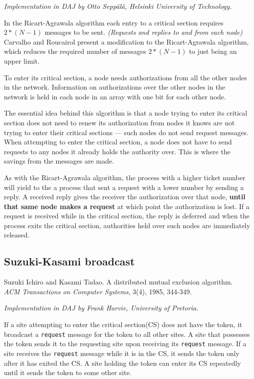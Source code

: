 \documentclass[11pt]{article}
\newcommand{\p}[1]{\texttt{#1}}
\begin{document}
\emph{Implementation in DAJ by Otto Sepp\"al\"a, Helsinki University of Technology.}

In the Ricart-Agrawala algorithm each entry to a critical section requires
$2*(N-1)$ messages to be sent. \emph{(Requests and replies to and from each node)}
Carvalho and Roucairol present a modification to the Ricart-Agrawala algorithm,
which reduces the required number of messages $2*(N-1)$ to just being an upper limit.

To enter its critical section, a node needs authorizations from all the other
nodes in the network. Information on authorizations over the
other nodes in the network is held in each node in an array
with one bit for each other node.

The essential idea behind this algorithm is that a node
trying to enter its critical section does not need to renew its authorization
from nodes it knows are not trying to enter their critical sections --- such nodes
do not send request messages. When attempting to enter the critical section,
a node does not have to send requests to any nodes it already holds the
authority over. This is where the savings from the messages are made.
 
As with the Ricart-Agrawala algorithm, the process with a higher ticket number
will yield to the a process that sent a request with a lower number by sending
a reply. A received reply gives the receiver the authorization over that node,
{\bf until that same node makes a request} at which point the authorization is lost.
If a request is received while in the critical section, the reply is deferred
and when the process exits the critical section, authorities held over such
nodes are immediately released.



\subsection{Suzuki-Kasami broadcast}


Suzuki Ichiro and Kasami Tadao.
A distributed mutual exclusion algorithm.
\emph{ACM Transactions on Computer Systems}, 3(4), 1985, 344-349.

\emph{Implementation in DAJ by Frank Harvie, University of Pretoria.}


If a site attempting to enter the critical section(CS) does not have
the token, it broadcast a \p{request} message for the token to all other sites.
A site that possesses
the token sends it to the requesting site upon receiving its \p{request}
message. If a site receives the \p{request} message while it is in the CS,
it sends the token only
after it has exited the CS. A site holding the token can enter its
CS repeatedly until it sends the token to some other site.
\end{document}
